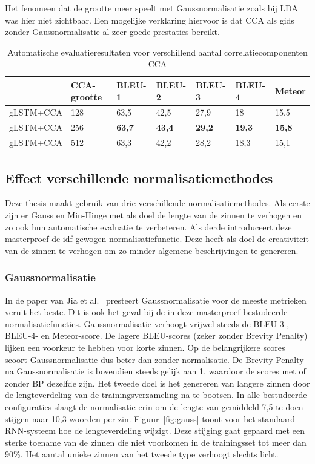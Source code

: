 Het fenomeen dat de grootte meer speelt met Gaussnormalisatie zoals bij LDA was hier niet zichtbaar. Een mogelijke verklaring hiervoor is dat CCA als gids zonder Gaussnormalisatie al zeer goede prestaties bereikt.
\begin{table}
	\centering
	\begin{tabular}{lllllll}
		~              & CCA-grootte     & BLEU-1 & BLEU-2 & BLEU-3 & BLEU-4 & Meteor \\ \hline
		gLSTM+CCA & 128        & 63,5   & 42,5 			& 27,9   & 18   & 15,5  \\
		gLSTM+CCA & 256        & \textbf{63,7}   & \textbf{43,4}   & \textbf{29,2}   & \textbf{19,3}   & \textbf{15,8}  \\
		gLSTM+CCA & 512        & 63,3   & 42,2   & 28,2   & 18,3 & 15,1  \\ \hline
	
	\end{tabular}

	\caption{Automatische evaluatieresultaten voor verschillend aantal correlatiecomponenten CCA}
		\label{table:results_cca}
\end{table}



\subsection{Effect verschillende normalisatiemethodes}
Deze thesis maakt gebruik van drie verschillende normalisatiemethodes. Als eerste zijn er Gauss en Min-Hinge met als doel de lengte van de zinnen te verhogen en zo ook hun automatische evaluatie te verbeteren. Als derde introduceert deze masterproef de idf-gewogen normalisatiefunctie. Deze heeft als doel de creativiteit van de zinnen te verhogen om zo minder algemene beschrijvingen te genereren.

\subsubsection{Gaussnormalisatie}
In de paper van Jia et al.~\cite{Fernando2015} presteert Gaussnormalisatie voor de meeste metrieken veruit het beste. 
Dit is ook het geval bij de in deze masterproef bestudeerde normalisatiefuncties. Gaussnormalisatie verhoogt vrijwel steeds de BLEU-3-, BLEU-4- en Meteor-score. De lagere BLEU-scores (zeker zonder Brevity Penalty) lijken een voorkeur te hebben voor korte zinnen. Op de belangrijkere scores scoort Gaussnormalisatie dus beter dan zonder normalisatie. De Brevity Penalty na Gaussnormalisatie is bovendien steeds gelijk aan 1, waardoor de scores met of zonder BP dezelfde zijn.
Het tweede doel is het genereren van langere zinnen door de lengteverdeling van de trainingsverzameling na te bootsen.
In alle bestudeerde configuraties slaagt de normalisatie erin om de lengte van gemiddeld 7,5 te doen stijgen naar 10,3 woorden per zin. Figuur~\ref{fig:gauss} toont voor het standaard RNN-systeem hoe de lengteverdeling wijzigt. Deze stijging gaat gepaard met een sterke toename van de zinnen die niet voorkomen in de trainingsset tot meer dan 90\%. Het aantal unieke zinnen van het tweede type verhoogt slechts licht. 

